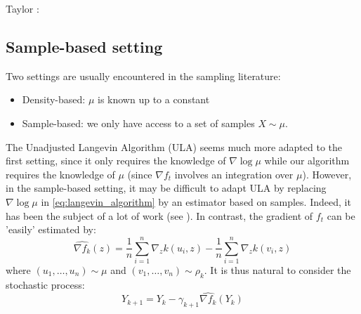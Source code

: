 Taylor : 


\subsection{Sample-based setting}

Two settings are usually encountered in the sampling literature:
\begin{itemize}
	\item Density-based: $\mu$ is known up to a constant
	\item Sample-based: we only have access to a set of samples $X \sim \mu$.
\end{itemize}

The Unadjusted Langevin Algorithm (ULA) seems much more adapted to the first setting, since it only requires the knowledge of $\nabla \log \mu$ while our algorithm requires the knowledge of $\mu$ (since $\nabla f_t$ involves an integration over $\mu$). However, in the sample-based setting, it may be difficult to adapt ULA by replacing $\nabla \log \mu$ in \eqref{eq:langevin_algorithm} by an estimator based on samples. Indeed, it has been the subject of a lot of work (see \cite{li2017gradient}). In contrast, the gradient of $f_t$ can be 'easily' estimated by:
\begin{equation}
\widehat{\nabla f_k}(z)= \frac{1}{n}\sum_{i=1}^{n}\nabla_{z}k(u_i,z) -\frac{1}{n}\sum_{i=1}^{n}\nabla_{z}k(v_i,z) 
\end{equation}
where $(u_1, \dots, u_n)\sim \mu$ and $(v_1, \dots, v_n)\sim \rho_k$. 
It is thus natural to consider the stochastic process:
\begin{equation}\label{eq:sample_based_process}
Y_{k+1}=Y_k-\gamma_{k+1}\widehat{\nabla f_k}(Y_k) 
\end{equation}


